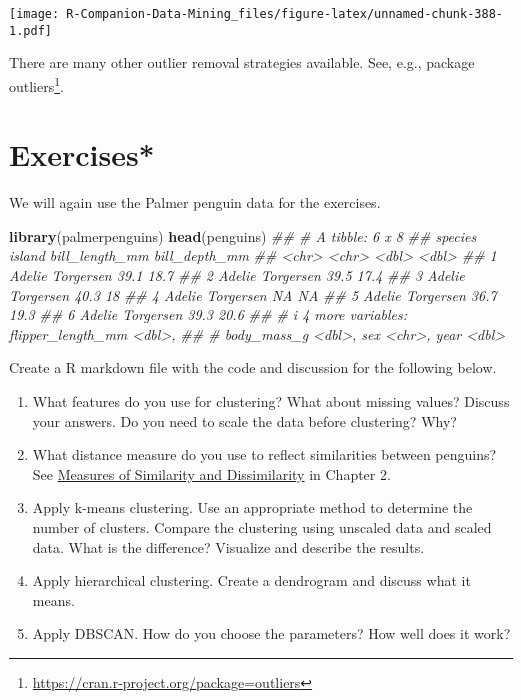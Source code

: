 \documentclass[
  notitlepage]{book}
\newenvironment{Shaded}{\begin{snugshade}}{\end{snugshade}}
\newcommand{\CommentTok}[1]{\textcolor[rgb]{0.56,0.35,0.01}{\textit{#1}}}
\newcommand{\KeywordTok}[1]{\textcolor[rgb]{0.13,0.29,0.53}{\textbf{#1}}}
\newcommand{\NormalTok}[1]{#1}
\DeclareRobustCommand{\href}[2]{#2\footnote{\url{#1}}}
\providecommand{\tightlist}{%
  \setlength{\itemsep}{0pt}\setlength{\parskip}{0pt}}
\begin{document}
\texttt{[image: R-Companion-Data-Mining\_files/figure-latex/unnamed-chunk-388-1.pdf]}

There are many other outlier removal strategies available. See, e.g.,
package \href{https://cran.r-project.org/package=outliers}{outliers}.

\hypertarget{exercises-4}{%
\section{Exercises*}\label{exercises-4}}

We will again use the Palmer penguin data for the exercises.

\begin{Shaded}
\begin{Highlighting}[]
\KeywordTok{library}\NormalTok{(palmerpenguins)}
\KeywordTok{head}\NormalTok{(penguins)}
\CommentTok{\#\# \# A tibble: 6 x 8}
\CommentTok{\#\#   species island    bill\_length\_mm bill\_depth\_mm}
\CommentTok{\#\#   \textless{}chr\textgreater{}   \textless{}chr\textgreater{}              \textless{}dbl\textgreater{}         \textless{}dbl\textgreater{}}
\CommentTok{\#\# 1 Adelie  Torgersen           39.1          18.7}
\CommentTok{\#\# 2 Adelie  Torgersen           39.5          17.4}
\CommentTok{\#\# 3 Adelie  Torgersen           40.3          18  }
\CommentTok{\#\# 4 Adelie  Torgersen           NA            NA  }
\CommentTok{\#\# 5 Adelie  Torgersen           36.7          19.3}
\CommentTok{\#\# 6 Adelie  Torgersen           39.3          20.6}
\CommentTok{\#\# \# i 4 more variables: flipper\_length\_mm \textless{}dbl\textgreater{},}
\CommentTok{\#\# \#   body\_mass\_g \textless{}dbl\textgreater{}, sex \textless{}chr\textgreater{}, year \textless{}dbl\textgreater{}}
\end{Highlighting}
\end{Shaded}

Create a R markdown file with the code and discussion for the following below.

\begin{enumerate}
\def\labelenumi{\arabic{enumi}.}
\tightlist
\item
  What features do you use for clustering? What about missing values?
  Discuss your answers. Do you need to scale the data before clustering? Why?
\item
  What distance measure do you use to reflect similarities between penguins?
  See \protect\hyperlink{measures-of-similarity-and-dissimilarity}{Measures of Similarity and Dissimilarity} in Chapter 2.
\item
  Apply k-means clustering. Use an appropriate method to determine the number
  of clusters. Compare the clustering using unscaled data and
  scaled data. What is the difference? Visualize and describe the results.
\item
  Apply hierarchical clustering.
  Create a dendrogram and discuss what it means.
\item
  Apply DBSCAN. How do you choose the parameters? How well does it work?
\end{enumerate}
\end{document}
